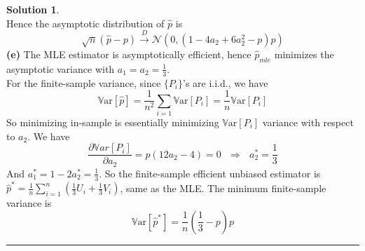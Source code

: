 \documentclass[a4paper, 10pt]{article}
\theoremstyle{definition}
\theoremstyle{hSol}
\newtheorem*{solution}{Solution}
\begin{document}
\begin{solution}
\begin{equation}
\end{equation}
Hence the asymptotic distribution of $\hat{p}$ is
$$
\sqrt{n}(\hat{p} - p) \xrightarrow{D} \mathcal{N}(0, \left(1-4a_2+6a_2^2-p\right)p)
$$
\textbf{(e)} The MLE estimator is asymptotically efficient, hence $\hat{p}_{mle}$ minimizes the asymptotic variance with $a_1=a_2=\frac{1}{3}$. \\
For the finite-sample variance, since $\{P_i\}$'s are i.i.d., we have
\begin{equation}
  \mathrm{\mathbb{V}ar}\left[\hat{p}\right] = \frac{1}{n^2}\sum_{i=1} \mathrm{\mathbb{V}ar}\left[P_i\right] = \frac{1}{n} \mathrm{\mathbb{V}ar}\left[P_i\right]
\end{equation}
So minimizing in-sample is essentially minimizing $\mathrm{\mathbb{V}ar}\left[P_i\right]$ variance with respect to $a_2$. We have
\begin{equation}
  \frac{\partial \mathbb{V}ar\left[P_i\right]}{\partial a_2} =  p(12a_2-4) = 0~~~\Rightarrow ~~~a_2^*=\frac{1}{3}
\end{equation}
And $a_1^*=1-2a_2^* = \frac{1}{3}$. So the finite-sample efficient unbiased estimator is $\hat{p}^* = \frac{1}{n}\sum_{i=1}^n (\frac{1}{3}U_i+\frac{1}{3}V_i)$, same as the MLE. The minimum finite-sample variance is
\begin{equation}
  \mathrm{\mathbb{V}ar}\left[\hat{p}^*\right] = \frac{1}{n} \left(\frac{1}{3}-p\right)p
\end{equation}
\end{solution}


\noindent\rule{16cm}{0.4pt}
\end{document}
